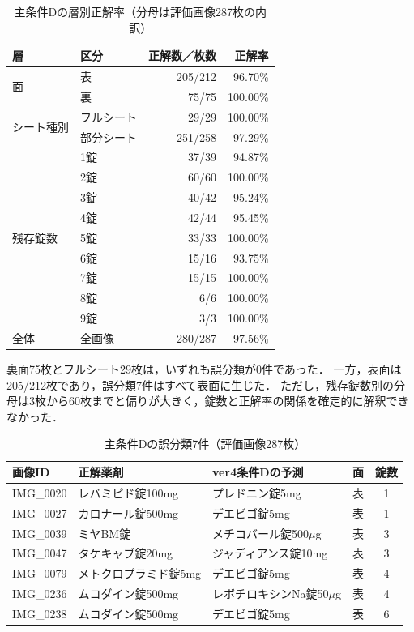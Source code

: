 \documentclass[uplatex,dvipdfmx]{jsarticle}
\begin{document}
\begin{table}[htbp]
  \centering
  \caption{主条件Dの層別正解率（分母は評価画像287枚の内訳）}
  \label{tab:condition_d_stratified}
  \small
  \begin{tabular}{|l|l|r|r|}
    \hline
    層 & 区分 & 正解数／枚数 & 正解率 \\ \hline
    \multirow{2}{*}{面} & 表 & 205/212 & 96.70\% \\ \cline{2-4}
     & 裏 & 75/75 & 100.00\% \\ \hline
    \multirow{2}{*}{シート種別} & フルシート & 29/29 & 100.00\% \\ \cline{2-4}
     & 部分シート & 251/258 & 97.29\% \\ \hline
    \multirow{9}{*}{残存錠数} & 1錠 & 37/39 & 94.87\% \\ \cline{2-4}
     & 2錠 & 60/60 & 100.00\% \\ \cline{2-4}
     & 3錠 & 40/42 & 95.24\% \\ \cline{2-4}
     & 4錠 & 42/44 & 95.45\% \\ \cline{2-4}
     & 5錠 & 33/33 & 100.00\% \\ \cline{2-4}
     & 6錠 & 15/16 & 93.75\% \\ \cline{2-4}
     & 7錠 & 15/15 & 100.00\% \\ \cline{2-4}
     & 8錠 & 6/6 & 100.00\% \\ \cline{2-4}
     & 9錠 & 3/3 & 100.00\% \\ \hline
    全体 & 全画像 & 280/287 & 97.56\% \\ \hline
  \end{tabular}
\end{table}

裏面75枚とフルシート29枚は，いずれも誤分類が0件であった．
一方，表面は205/212枚であり，誤分類7件はすべて表面に生じた．
ただし，残存錠数別の分母は3枚から60枚までと偏りが大きく，錠数と正解率の関係を確定的に解釈できなかった．

\begin{table}[htbp]
  \centering
  \caption{主条件Dの誤分類7件（評価画像287枚）}
  \label{tab:condition_d_errors}
  \scriptsize
  \setlength{\tabcolsep}{2pt}
  \begin{tabular}{|p{1.5cm}|p{3.3cm}|p{3.6cm}|c|c|}
    \hline
    画像ID & 正解薬剤 & ver4条件Dの予測 & 面 & 錠数 \\ \hline
    IMG\_0020 & レバミピド錠100mg & プレドニン錠5mg & 表 & 1 \\ \hline
    IMG\_0027 & カロナール錠500mg & デエビゴ錠5mg & 表 & 1 \\ \hline
    IMG\_0039 & ミヤBM錠 & メチコバール錠500$\mu$g & 表 & 3 \\ \hline
    IMG\_0047 & タケキャブ錠20mg & ジャディアンス錠10mg & 表 & 3 \\ \hline
    IMG\_0079 & メトクロプラミド錠5mg & デエビゴ錠5mg & 表 & 4 \\ \hline
    IMG\_0236 & ムコダイン錠500mg & レボチロキシンNa錠50$\mu$g & 表 & 4 \\ \hline
    IMG\_0238 & ムコダイン錠500mg & デエビゴ錠5mg & 表 & 6 \\ \hline
  \end{tabular}
\end{table}
\end{document}
